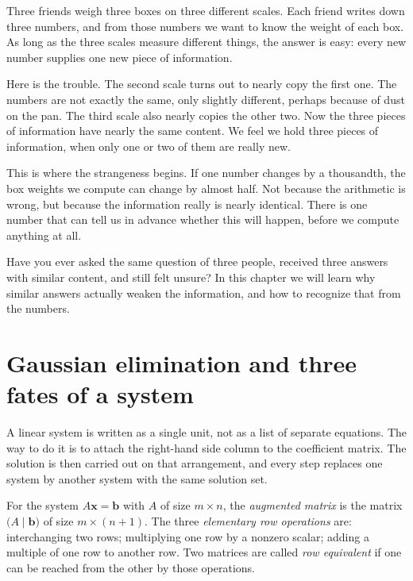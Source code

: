 \begin{untukanak}
Three friends weigh three boxes on three different scales. Each friend writes down three
numbers, and from those numbers we want to know the weight of each box. As long as the three
scales measure different things, the answer is easy: every new number supplies one new piece
of information.

Here is the trouble. The second scale turns out to nearly copy the first one. The numbers are
not exactly the same, only slightly different, perhaps because of dust on the pan. The third
scale also nearly copies the other two. Now the three pieces of information have nearly the
same content. We feel we hold three pieces of information, when only one or two of them are
really new.

This is where the strangeness begins. If one number changes by a thousandth, the box weights
we compute can change by almost half. Not because the arithmetic is wrong, but because the
information really is nearly identical. There is one number that can tell us in advance
whether this will happen, before we compute anything at all.

Have you ever asked the same question of three people, received three answers with similar
content, and still felt unsure? In this chapter we will learn why similar answers actually
weaken the information, and how to recognize that from the numbers.
\end{untukanak}

\section{Gaussian elimination and three fates of a system}

A linear system is written as a single unit, not as a list of separate equations. The way to
do it is to attach the right-hand side column to the coefficient matrix. The solution is then
carried out on that arrangement, and every step replaces one system by another system with the
same solution set.


\begin{definisi}
For the system $A\mathbf{x}=\mathbf{b}$ with $A$ of size $m\times n$, the \emph{augmented
matrix} is the matrix $\bigl(A\mid\mathbf{b}\bigr)$ of size $m\times(n+1)$. The three
\emph{elementary row operations} are: interchanging two rows; multiplying one row by a
nonzero scalar; adding a multiple of one row to another row. Two matrices are called
\emph{row equivalent} if one can be reached from the other by those operations.
\end{definisi}

